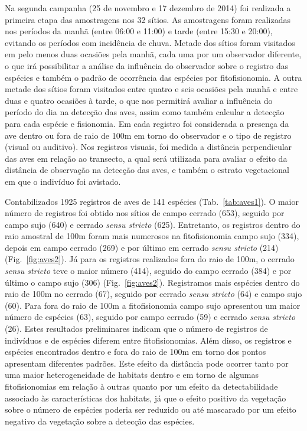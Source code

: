 \documentclass[12pt, A4]{article}
\begin{document}
Na segunda campanha (25 de novembro e 17 dezembro de
2014) foi realizada a primeira etapa das amostragens nos 32 sítios. 
As amostragens foram realizadas nos períodos da manhã (entre 06:00 e
11:00) e tarde (entre 15:30 e 20:00), evitando os períodos com
incidência de chuva. Metade dos sítios foram visitados em
pelo menos duas ocasiões pela manhã, cada uma por um observador
diferente, o que irá possibilitar a análise da influência do
observador sobre o registro das espécies e também o
padrão de ocorrência das espécies por fitofisionomia. A outra metade
dos sítios foram visitados entre quatro e seis ocasiões pela manhã e
entre duas e quatro ocasiões à tarde, o que nos permitirá avaliar a
influência do período do dia na detecção das aves, assim como também
calcular a detecção para cada espécie e fisionomia. Em cada registro
foi considerada a presença da ave dentro ou fora de raio de 100m em torno do observador
e o tipo de registro (visual ou auditivo). Nos registros visuais, foi
medida a distância perpendicular das aves em relação ao
transecto, a qual será utilizada para avaliar o efeito da distância de
observação na detecção das aves, e também o estrato vegetacional em que o
indivíduo foi avistado. 

Contabilizados 1925 registros de aves de 141 espécies (Tab.~\ref{tab:aves1}).
O maior número de
registros foi obtido nos sítios de campo cerrado (653), seguido
por campo sujo (640) e cerrado \textit{sensu stricto}
(625). Entretanto, os
registros dentro do raio amostral de 100m foram mais numerosos na
fitofisionomia campo sujo (334), depois em campo cerrado (269) e por
último em cerrado \textit{sensu stricto} (214) (Fig.~\ref{fig:aves2}). 
Já para os
registros realizados fora do raio de 100m,
o cerrado \textit{sensu stricto} teve o maior número (414), 
seguido do campo cerrado (384) e
por último o campo sujo (306) (Fig.~\ref{fig:aves2}). 
Registramos mais espécies dentro do raio de 100m no
cerrado (67), seguido por cerrado \textit{sensu stricto} (64) e campo
sujo (60). Para fora do raio de 100m 
a fitofisionomia campo sujo apresentou um maior número de espécies (63), seguido por campo
cerrado (59) e cerrado \textit{sensu stricto} (26).
Estes resultados preliminares indicam que o número de registros de indivíduos e de espécies
diferem entre fitofisionomias. Além disso, 
os registros e espécies encontrados dentro e fora do raio de 100m
em torno dos pontos apresentam diferentes padrões. Este efeito da
distância pode ocorrer tanto por uma maior heterogeneidade de habitats
dentro e em torno de algumas fitofisionomias em relação à outras quanto por um
efeito da detectabilidade associado às características dos habitats,
já que o efeito positivo da vegetação sobre o número de espécies
poderia ser reduzido ou até mascarado por um efeito negativo da
vegetação sobre a detecção das espécies.
\end{document}
